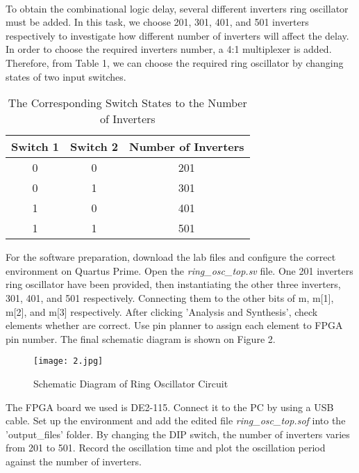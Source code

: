 \documentclass[12pt]{article}
\begin{document}
    \paragraph{}
    To obtain the combinational logic delay, several different inverters ring oscillator must be added. In this task, we choose 201, 301, 401, and 501 inverters respectively to investigate how different number of inverters will affect the delay. In order to choose the required inverters number, a 4:1 multiplexer is added. Therefore, from Table 1, we can choose the required ring oscillator by changing states of two input switches.
    \begin{table}[H]
    \centering
    \caption{The Corresponding Switch States to the Number of  Inverters}
    \label{tab:my-table}
    \begin{tabular}{c c c}
    \hline
    Switch 1 & Switch 2 & Number of Inverters \\
    \hline
    0        & 0        & 201                 \\
    0        & 1        & 301                 \\
    1        & 0        & 401                 \\
    1        & 1        & 501                
    \end{tabular}
    \end{table}
    For the software preparation, download the lab files and configure the correct environment on Quartus Prime. Open the \textit{ring\_osc\_top.sv} file. One 201 inverters ring oscillator have been provided, then instantiating the other three inverters, 301, 401, and 501 respectively. Connecting them to the other bits of m, m[1], m[2], and m[3] respectively. After clicking 'Analysis and Synthesis', check elements whether are correct. Use pin planner to assign each element to FPGA pin number. The final schematic diagram is shown on Figure 2.
    \begin{figure}[H]
    \centering
    \texttt{[image: 2.jpg]}
    \caption{Schematic Diagram of Ring Oscillator Circuit}
    \end{figure}
    The FPGA board we used is DE2-115. Connect it to the PC by using a USB cable. Set up the environment and add the edited file \textit{ring\_osc\_top.sof} into the 'output\_files' folder. By changing the DIP switch, the number of inverters varies from 201 to 501. Record the oscillation time and plot the oscillation period against the number of inverters.
\end{document}
